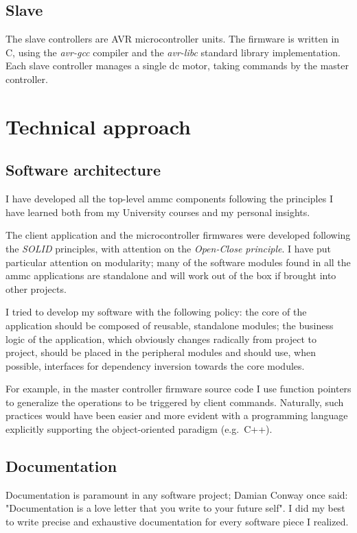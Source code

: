 \documentclass[binding=0.6cm,Lau]{sapthesis}
\begin{document}
\subsection{Slave}
The slave controllers are AVR microcontroller units. The firmware is written in
C, using the \emph{avr-gcc} compiler and the \emph{avr-libc} standard library
implementation. Each slave controller manages a single dc motor, taking
commands by the master controller.

\section{Technical approach}

\subsection{Software architecture}
I have developed all the top-level ammc components following the principles I
have learned both from my University courses\cite{fondamenti2-prog} and my
personal insights\cite{clean-architecture}\cite{cpp-ref}.

The client application and the microcontroller firmwares were developed
following the \emph{SOLID} principles, with attention on the \emph{Open-Close
principle}.  I have put particular attention on modularity; many of the
software modules found in all the ammc applications are standalone and will
work out of the box if brought into other projects.

I tried to develop my software with the following policy: the core of the
application should be composed of reusable, standalone modules; the business
logic of the application, which obviously changes radically from project to
project, should be placed in the peripheral modules and should use, when
possible, interfaces for dependency inversion towards the core modules.

For example, in the master controller firmware source code I use function
pointers to generalize the operations to be triggered by client commands.
Naturally, such practices would have been easier and more evident with a
programming language explicitly supporting the object-oriented paradigm (e.g.\
C++).

\subsection{Documentation}
Documentation is paramount in any software project; Damian Conway once said:
"Documentation is a love letter that you write to your future self". I did my
best to write precise and exhaustive documentation for every software piece I
realized.
\end{document}
